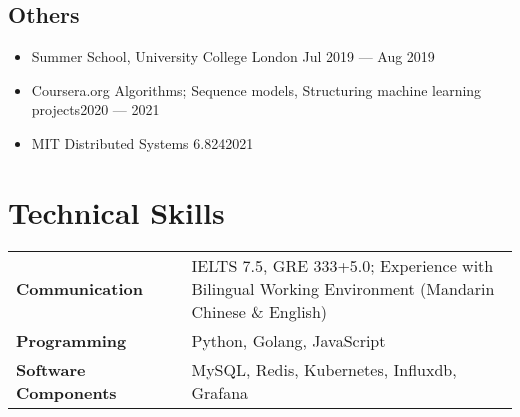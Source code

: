 \documentclass[a4,10pt]{article}
\newcommand{\subtext}[1]{
#1\par\vspace{-0.2cm}}
\newenvironment{zitemize}{
\begin{itemize}\itemsep0pt \parskip0pt \parsep1pt}
{\end{itemize}\vspace{-0.5cm}}
\newcommand{\hskills}[1]{
\textbf{\bfseries #1} }
\begin{document}
\subsection*{Others}
\begin{zitemize}
    \item
        \subtext{Summer School, University College London \hfill Jul 2019 --- Aug 2019}
        \vspace{0.1cm}
    \item
        \subtext{Coursera.org Algorithms; Sequence models, Structuring machine learning projects\hfill 2020 --- 2021 }
        \vspace{0.1cm}
    \item
        \subtext{MIT Distributed Systems 6.824\hfill2021}
        \vspace{0.1cm}
\end{zitemize}
\vspace{0.2cm}



\section{Technical Skills}
\begin{tabular}{p{11em} p{1em} p{43em}}
\hskills{Communication} & & IELTS 7.5, GRE 333+5.0; Experience with Bilingual Working Environment (Mandarin Chinese \& English)  \\
\hskills{Programming} &  & Python, Golang, JavaScript \\
\hskills{Software Components} & & MySQL, Redis, Kubernetes, Influxdb, Grafana
\end{tabular}
\vspace{-0.2cm}



\end{document}
